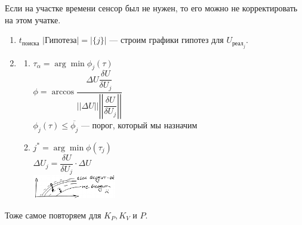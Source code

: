 \documentclass[a4paper]{article}
\begin{document}
Если на участке времени сенсор был не нужен, то его можно не корректировать на этом учатке.
\begin{enumerate}
    \item $t_\text{поиска}$ $|\text{Гипотеза}| = |\{j\}|$ — строим графики гипотез для $U_{\text{реал}_j}$.
    \item \begin{enumerate}
              \item $\tau_\alpha = \arg \min \phi_j(\tau)$ \\
                    $\phi = \arccos \dfrac{\Delta U \dfrac{\delta U}{\delta U_j}}{||\Delta U|| \left|\left|\dfrac{\delta U}{\delta U_j}\right|\right|}$ \\
                    $\phi_j(\tau) \leq \overline{\phi_j}$ — порог, который мы назначим
              \item $j^* = \arg \min \phi(\tau_j)$ \\
                    $\Delta U_j = \dfrac{\delta U}{\delta U_j} \cdot \Delta U$ \\
                    \includegraphics[width=0.3\textwidth]{graphics/pic03.jpg}
          \end{enumerate}
\end{enumerate}

Тоже самое повторяем для $K_P, K_V$ и $P$.
\end{document}
